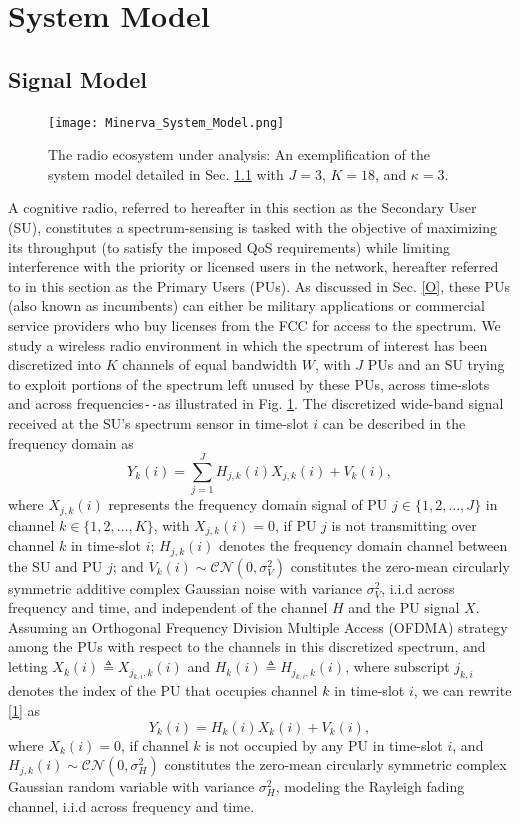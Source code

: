 \documentclass[12pt, draftcls, onecolumn]{IEEEtran}
\begin{document}
\section{System Model}\label{I}
\subsection{Signal Model}\label{I.I}
\begin{figure} [htb]
    \centerline{
    \texttt{[image: Minerva\_System\_Model.png]}}
    \caption{The radio ecosystem under analysis: An exemplification of the system model detailed in Sec. \ref{I.I} with $J{=}3$, $K{=}18$, and $\kappa{=}3$.}
    \label{fig: A.0}
\end{figure}
A cognitive radio, referred to hereafter in this section as the Secondary User (SU), constitutes a spectrum-sensing is tasked with the objective of maximizing its throughput (to satisfy the imposed QoS requirements) while limiting interference with the priority or licensed users in the network, hereafter referred to in this section as the Primary Users (PUs). As discussed in Sec.  \ref{O}, these PUs (also known as incumbents) can either be military applications or commercial service providers who buy licenses from the FCC for access to the spectrum. We study a wireless radio environment in which the spectrum of interest has been discretized into $K$ channels of equal bandwidth $W$, with $J$ PUs and an SU trying to exploit portions of the spectrum left unused by these PUs, across time-slots and across frequencies\texttt{-{}-}as illustrated in Fig. \ref{fig: A.0}. The discretized wide-band signal received at the SU's spectrum sensor in time-slot $i$ can be described in the frequency domain as
\begin{equation}\label{1}
    Y_{k}(i)=\sum_{j{=}1}^{J}{H_{j,k}(i)X_{j,k}(i)+V_{k}(i)},
\end{equation}
where $X_{j,k}(i)$ represents the frequency domain signal of PU $j{\in}\{1,2,\dots,J\}$ in channel $k \in \{1,2,\dots,K\}$, with $X_{j,k}(i){=}0$, if PU $j$ is not transmitting over channel $k$ in time-slot $i$; $H_{j,k}(i)$ denotes the frequency domain channel between the SU and PU $j$; and $V_{k}(i){\sim}\mathcal{CN}(0,\sigma_{V}^{2})$ constitutes the zero-mean circularly symmetric additive complex Gaussian noise with variance $\sigma_{V}^{2}$, i.i.d across frequency and time, and independent of the channel $H$ and the PU signal $X$. Assuming an Orthogonal Frequency Division Multiple Access (OFDMA) strategy among the PUs with respect to the channels in this discretized spectrum, and letting $X_{k}(i){\triangleq}X_{j_{k,i},k}(i)$ and $H_{k}(i){\triangleq}H_{j_{k,i},k}(i)$, where subscript $j_{k,i}$ denotes the index of the PU that occupies channel $k$ in time-slot $i$, we can rewrite \eqref{1} as
\begin{equation}\label{2}
    Y_{k}(i)=H_{k}(i)X_{k}(i)+V_{k}(i),
\end{equation}
where $X_{k}(i){=}0$, if channel $k$ is not occupied by any PU in time-slot $i$, and $H_{j,k}(i) \sim \mathcal{CN}(0,\sigma_{H}^{2})$ constitutes the zero-mean circularly symmetric complex Gaussian random variable with variance $\sigma_{H}^{2}$, modeling the Rayleigh fading channel, i.i.d across frequency and time.
\end{document}
